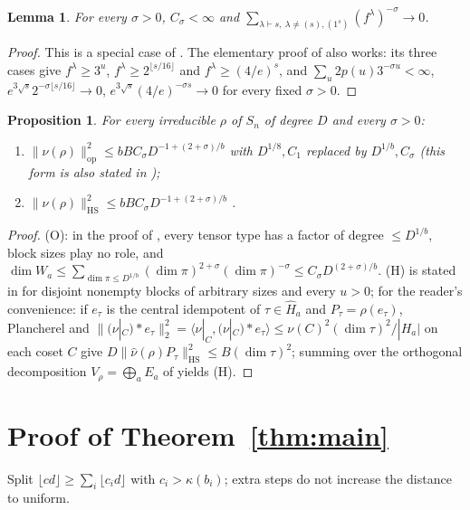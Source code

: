 \documentclass[11pt]{amsart}
\newtheorem{proposition}[theorem]{Proposition}
\newtheorem{lemma}[theorem]{Lemma}
\theoremstyle{remark}
\newcommand{\HS}{\mathrm{HS}}
\newcommand{\op}{\mathrm{op}}
\begin{document}
\begin{lemma}\label{lem:zeta}
For every $\sigma>0$, $C_\sigma<\infty$ and $\sum_{\lambda\vdash s,\ \lambda\ne(s),(1^s)}(f^\lambda)^{-\sigma}\to0$.
\end{lemma}
\begin{proof}
This is a special case of \cite[Thm.~2.6]{liebeck-shalev2004}. The elementary proof of
\cite[Lemma~5.1]{oai-thorp} also works: its three cases give $f^\lambda\ge3^u$, $f^\lambda\ge2^{\lfloor s/16\rfloor}$
and $f^\lambda\ge(4/e)^s$, and $\sum_u2p(u)3^{-\sigma u}<\infty$, $e^{3\sqrt s}2^{-\sigma\lfloor s/16\rfloor}\to0$,
$e^{3\sqrt s}(4/e)^{-\sigma s}\to0$ for every fixed $\sigma>0$.
\end{proof}

\begin{proposition}\label{prop:transfer}
For every irreducible $\rho$ of $S_n$ of degree $D$ and every $\sigma>0$:
\begin{enumerate}
\item[(O)] $\|\widehat\nu(\rho)\|_{\op}^2\le bBC_\sigma D^{-1+(2+\sigma)/b}$ \quad\cite[Prop.~6.1]{oai-thorp}
with $D^{1/8},C_1$ replaced by $D^{1/b},C_\sigma$ (this form is also stated in \cite[Thm.~1.1, (1.3)]{oai-transfer});
\item[(H)] $\|\widehat\nu(\rho)\|_{\HS}^2\le bBC_\sigma D^{-1+(2+\sigma)/b}$ \quad\cite[Thm.~1.1, (1.2)]{oai-transfer}.
\end{enumerate}
\end{proposition}
\begin{proof}
(O): in the proof of \cite[Prop.~6.1]{oai-thorp}, every tensor type has a factor of degree
$\le D^{1/b}$, block sizes play no role, and
$\dim W_a\le\sum_{\dim\pi\le D^{1/b}}(\dim\pi)^{2+\sigma}(\dim\pi)^{-\sigma}\le C_\sigma D^{(2+\sigma)/b}$.
(H) is stated in \cite{oai-transfer} for disjoint nonempty blocks of arbitrary sizes and every $u>0$; for the
reader's convenience: if $e_\tau$ is the central idempotent of $\tau\in\widehat H_a$ and $P_\tau=\rho(e_\tau)$,
Plancherel and $\|(\nu|_{C})*e_\tau\|_2^2=\langle\nu|_C,(\nu|_C)*e_\tau\rangle\le\nu(C)^2(\dim\tau)^2/|H_a|$
on each coset $C$ give $D\|\widehat\nu(\rho)P_\tau\|_{\HS}^2\le B(\dim\tau)^2$; summing over the orthogonal
decomposition $V_\rho=\bigoplus_aE_a$ of \cite[Prop.~6.1]{oai-thorp} yields (H).
\end{proof}

\section{Proof of Theorem~\ref{thm:main}}
Split $\lfloor cd\rfloor\ge\sum_i\lfloor c_id\rfloor$ with $c_i>\kappa(b_i)$; extra steps do not increase
the distance to uniform.
\end{document}
